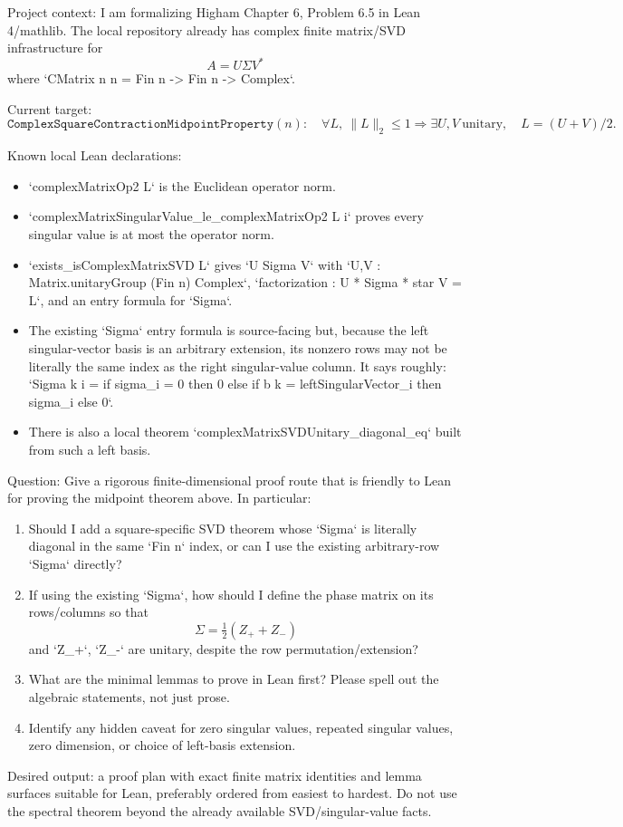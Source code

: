 \documentclass{article}
\begin{document}
Project context: I am formalizing Higham Chapter 6, Problem 6.5 in Lean 4/mathlib.
The local repository already has complex finite matrix/SVD infrastructure for
\[
  A = U \Sigma V^*
\]
where `CMatrix n n = Fin n -> Fin n -> Complex`.

Current target:
\[
\texttt{ComplexSquareContractionMidpointProperty}(n):
\quad
\forall L,\ \|L\|_2 \le 1 \Rightarrow
\exists U,V\ \text{unitary},\quad L = (U+V)/2.
\]

Known local Lean declarations:
\begin{itemize}
\item `complexMatrixOp2 L` is the Euclidean operator norm.
\item `complexMatrixSingularValue_le_complexMatrixOp2 L i` proves every singular
  value is at most the operator norm.
\item `exists_isComplexMatrixSVD L` gives `U Sigma V` with
  `U,V : Matrix.unitaryGroup (Fin n) Complex`,
  `factorization : U * Sigma * star V = L`, and an entry formula for `Sigma`.
\item The existing `Sigma` entry formula is source-facing but, because the left
  singular-vector basis is an arbitrary extension, its nonzero rows may not be
  literally the same index as the right singular-value column. It says roughly:
  `Sigma k i = if sigma_i = 0 then 0 else if b k = leftSingularVector_i then sigma_i else 0`.
\item There is also a local theorem `complexMatrixSVDUnitary_diagonal_eq` built
  from such a left basis.
\end{itemize}

Question:
Give a rigorous finite-dimensional proof route that is friendly to Lean for
proving the midpoint theorem above. In particular:
\begin{enumerate}
\item Should I add a square-specific SVD theorem whose `Sigma` is literally
  diagonal in the same `Fin n` index, or can I use the existing arbitrary-row
  `Sigma` directly?
\item If using the existing `Sigma`, how should I define the phase matrix on
  its rows/columns so that
  \[
    \Sigma = \tfrac12(Z_+ + Z_-)
  \]
  and `Z_+`, `Z_-` are unitary, despite the row permutation/extension?
\item What are the minimal lemmas to prove in Lean first? Please spell out the
  algebraic statements, not just prose.
\item Identify any hidden caveat for zero singular values, repeated singular
  values, zero dimension, or choice of left-basis extension.
\end{enumerate}

Desired output: a proof plan with exact finite matrix identities and lemma
surfaces suitable for Lean, preferably ordered from easiest to hardest. Do not
use the spectral theorem beyond the already available SVD/singular-value facts.
\end{document}
